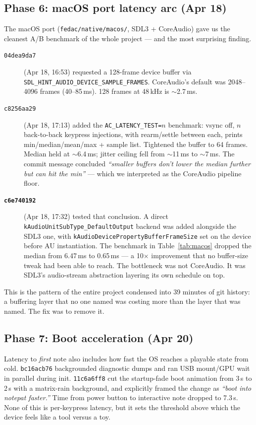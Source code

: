 \documentclass[10pt,letterpaper,twocolumn]{article}
\begin{document}
\subsection{Phase 6: macOS port latency arc (Apr 18)}

The macOS port (\texttt{fedac/native/macos/}, SDL3 + CoreAudio) gave us the cleanest A/B benchmark of the whole project --- and the most surprising finding.

\begin{description}
\item[\texttt{04dea9da7}] (Apr 18, 16:53) requested a 128-frame device buffer via \texttt{SDL\_HINT\_AUDIO\_DEVICE\_SAMPLE\_FRAMES}. CoreAudio's default was 2048--4096 frames (40--85\,ms). 128 frames at 48\,kHz is $\sim$2.7\,ms.
\item[\texttt{c8256aa29}] (Apr 18, 17:13) added the \texttt{AC\_LATENCY\_TEST=$n$} benchmark: vsync off, $n$ back-to-back keypress injections, with rearm/settle between each, prints min/median/mean/max + sample list. Tightened the buffer to 64 frames. Median held at $\sim$6.4\,ms; jitter ceiling fell from $\sim$11\,ms to $\sim$7\,ms. The commit message concluded \emph{``smaller buffers don't lower the median further but can hit the min''} --- which we interpreted as the CoreAudio pipeline floor.
\item[\textbf{\texttt{c6e740192}}] (Apr 18, 17:32) tested that conclusion. A direct \texttt{kAudioUnitSubType\_DefaultOutput} backend was added alongside the SDL3 one, with \texttt{kAudioDevicePropertyBufferFrameSize} set on the device before AU instantiation. The benchmark in Table~\ref{tab:macos} dropped the median from 6.47\,ms to 0.65\,ms --- a 10$\times$ improvement that no buffer-size tweak had been able to reach. The bottleneck was not CoreAudio. It was SDL3's audio-stream abstraction layering its own schedule on top.
\end{description}

This is the pattern of the entire project condensed into 39 minutes of git history: a buffering layer that no one named was costing more than the layer that was named. The fix was to remove it.

\subsection{Phase 7: Boot acceleration (Apr 20)}

Latency to \emph{first} note also includes how fast the OS reaches a playable state from cold. \texttt{bc16acb76} backgrounded diagnostic dumps and ran USB mount/GPU wait in parallel during init. \texttt{11c6a6ff8} cut the startup-fade boot animation from 3\,s to 2\,s with a matrix-rain background, and explicitly framed the change as \emph{``boot into notepat faster.''} Time from power button to interactive note dropped to 7.3\,s. None of this is per-keypress latency, but it sets the threshold above which the device feels like a tool versus a toy.
\end{document}
